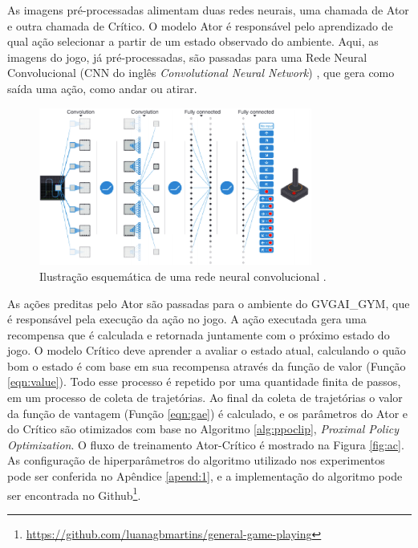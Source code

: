 
As imagens pré-processadas alimentam duas redes neurais, uma chamada de Ator e outra chamada de Crítico. O modelo Ator é responsável pelo aprendizado de qual ação selecionar a partir de um estado observado do ambiente. Aqui, as imagens do jogo, já pré-processadas, são passadas para uma Rede Neural Convolucional (CNN do inglês \textit{Convolutional Neural Network}) \cite{Krizhevsky12}, que gera como saída uma ação, como andar ou atirar. 

\begin{figure}[ht]
 \centering
  \includegraphics[width=0.8\textwidth]{./fig/cnngame}
  \captionsetup{width=1\textwidth}
 \caption{Ilustração esquemática de uma rede neural convolucional \cite{mnih15}.}
 \label{fig:cnn}
\end{figure}

As ações preditas pelo Ator são passadas para o ambiente do GVGAI\_GYM, que é responsável pela execução da ação no jogo. A ação executada gera uma recompensa que é calculada e retornada juntamente com o próximo estado do jogo. O modelo Crítico deve aprender a avaliar o estado atual, calculando o quão bom o estado é com base em sua recompensa através da função de valor (Função \ref{eqn:value}). Todo esse processo é repetido por uma quantidade finita de passos, em um processo de coleta de trajetórias. Ao final da coleta de trajetórias o valor da função de vantagem (Função \ref{eqn:gae}) é calculado, e os parâmetros do Ator e do Crítico são otimizados com base no Algoritmo \ref{alg:ppoclip}, \textit{Proximal Policy Optimization}. O fluxo de treinamento Ator-Crítico é mostrado na Figura \ref{fig:ac}. As configuração de hiperparâmetros do algoritmo utilizado nos experimentos pode ser conferida no Apêndice \ref{apend:1}, e a implementação do algoritmo pode ser encontrada no Github\footnote{\url{https://github.com/luanagbmartins/general-game-playing}}.

